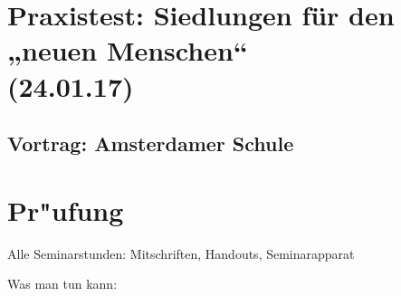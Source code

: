 \documentclass[emulatestandardclasses]{scrartcl}
\begin{document}
\section{Praxistest: Siedlungen für den „neuen Menschen“\\(24.01.17)}


\subsection{Vortrag: Amsterdamer Schule}


\section{Pr"ufung}

Alle Seminarstunden: Mitschriften, Handouts, Seminarapparat

Was man tun kann: 


%
\end{document}
